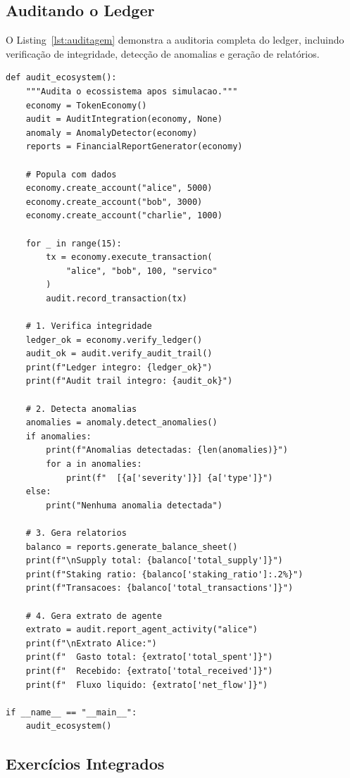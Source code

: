\subsection{Auditando o Ledger}

O Listing~\ref{lst:auditagem} demonstra a auditoria completa do
ledger, incluindo verificação de integridade, detecção de
anomalias e geração de relatórios.

\begin{lstlisting}[caption={Auditoria completa do ecossistema},
                  label={lst:auditagem}]
def audit_ecosystem():
    """Audita o ecossistema apos simulacao."""
    economy = TokenEconomy()
    audit = AuditIntegration(economy, None)
    anomaly = AnomalyDetector(economy)
    reports = FinancialReportGenerator(economy)

    # Popula com dados
    economy.create_account("alice", 5000)
    economy.create_account("bob", 3000)
    economy.create_account("charlie", 1000)

    for _ in range(15):
        tx = economy.execute_transaction(
            "alice", "bob", 100, "servico"
        )
        audit.record_transaction(tx)

    # 1. Verifica integridade
    ledger_ok = economy.verify_ledger()
    audit_ok = audit.verify_audit_trail()
    print(f"Ledger integro: {ledger_ok}")
    print(f"Audit trail integro: {audit_ok}")

    # 2. Detecta anomalias
    anomalies = anomaly.detect_anomalies()
    if anomalies:
        print(f"Anomalias detectadas: {len(anomalies)}")
        for a in anomalies:
            print(f"  [{a['severity']}] {a['type']}")
    else:
        print("Nenhuma anomalia detectada")

    # 3. Gera relatorios
    balanco = reports.generate_balance_sheet()
    print(f"\nSupply total: {balanco['total_supply']}")
    print(f"Staking ratio: {balanco['staking_ratio']:.2%}")
    print(f"Transacoes: {balanco['total_transactions']}")

    # 4. Gera extrato de agente
    extrato = audit.report_agent_activity("alice")
    print(f"\nExtrato Alice:")
    print(f"  Gasto total: {extrato['total_spent']}")
    print(f"  Recebido: {extrato['total_received']}")
    print(f"  Fluxo liquido: {extrato['net_flow']}")

if __name__ == "__main__":
    audit_ecosystem()
\end{lstlisting}

\subsection{Exercícios Integrados}

